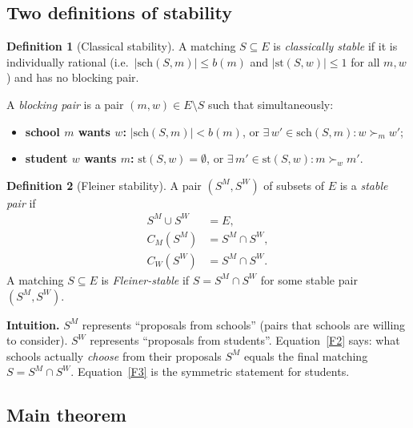 \documentclass[12pt, a4paper]{article}
\theoremstyle{definition}
\newtheorem{definition}{Definition}[section]
\theoremstyle{plain}
\theoremstyle{remark}
\newcommand{\CM}{C_M}
\newcommand{\CW}{C_W}
\newcommand{\SM}{S^M}
\newcommand{\SW}{S^W}
\newcommand{\school}[2]{\mathrm{sch}(#1,#2)}
\newcommand{\stud}[2]{\mathrm{st}(#1,#2)}
\newcommand{\quota}{b}
\begin{document}
\subsection{Two definitions of stability}

\begin{definition}[Classical stability]
\label{def:classical}
A matching $S \subseteq E$ is \emph{classically stable} if it is individually
rational (i.e.\ $|\school{S}{m}| \leq \quota(m)$ and $|\stud{S}{w}| \leq 1$
for all $m, w$) and has no blocking pair.

A \emph{blocking pair} is a pair $(m, w) \in E \setminus S$ such that
simultaneously:
\begin{itemize}
  \item \textbf{school $m$ wants $w$:} $|\school{S}{m}| < \quota(m)$, or
    $\exists\, w' \in \school{S}{m} : w \succ_m w'$;
  \item \textbf{student $w$ wants $m$:} $\stud{S}{w} = \emptyset$, or
    $\exists\, m' \in \stud{S}{w} : m \succ_w m'$.
\end{itemize}
\end{definition}

\begin{definition}[Fleiner stability]
\label{def:fleiner}
A pair $(\SM, \SW)$ of subsets of $E$ is a \emph{stable pair} if
\begin{align}
  \SM \cup \SW &= E, \tag{F1}\label{F1}\\
  \CM(\SM)     &= \SM \cap \SW, \tag{F2}\label{F2}\\
  \CW(\SW)     &= \SM \cap \SW. \tag{F3}\label{F3}
\end{align}
A matching $S \subseteq E$ is \emph{Fleiner-stable} if $S = \SM \cap \SW$
for some stable pair $(\SM, \SW)$.
\end{definition}

\begin{bluebox}
\textbf{Intuition.}
$\SM$ represents ``proposals from schools'' (pairs that schools are willing to
consider). $\SW$ represents ``proposals from students''.
Equation~\eqref{F2} says: what schools actually \emph{choose} from their
proposals $\SM$ equals the final matching $S = \SM \cap \SW$.
Equation~\eqref{F3} is the symmetric statement for students.
\end{bluebox}

\subsection{Main theorem}
\end{document}
